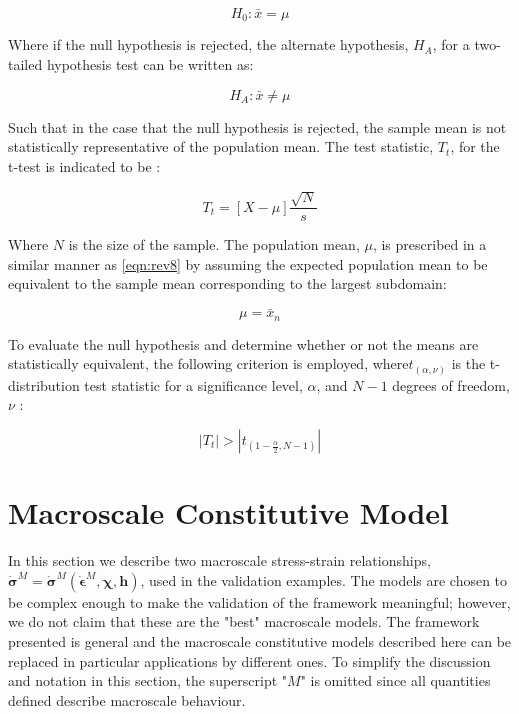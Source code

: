 \begin{equation}
H_0:\bar{x}=\mu
\label{eqn:rev11}
\end{equation}

Where if the null hypothesis is rejected, the alternate hypothesis, $H_A$, for a two-tailed hypothesis test can be written as:

\begin{equation}
H_A:\bar{x}\neq\mu
\label{eqn:rev12}
\end{equation}

Such that in the case that the null hypothesis is rejected, the sample mean is not statistically representative of the population mean. The test statistic, $T_t$, for the t-test is indicated to be \citep{walpole_probability_2007}:

\begin{equation}
T_t=\left[X-\mu\right]\frac{\sqrt{N}}{s}
\label{eqn:rev13}
\end{equation}

Where $N$ is the size of the sample. The population mean, $\mu$, is prescribed in a similar manner as \ref{eqn:rev8} by assuming the expected population mean to be equivalent to the sample mean corresponding to the largest subdomain:

\begin{equation}
\mu=\bar{x}_n
\label{eqn:rev14}
\end{equation}

To evaluate the null hypothesis and determine whether or not the means are statistically equivalent, the following criterion is employed, where$t_{\left(\alpha, \nu\right)}$ is the t-distribution test statistic for a significance level, $\alpha$, and $N-1$ degrees of freedom, $\nu$ \citep{walpole_probability_2007}:

\begin{equation}
\left|T_t\right|>\left|t_{\left(1-\frac{\alpha}{2}, N-1\right)}\right|
\label{eqn:rev15}
\end{equation}

\section{Macroscale Constitutive Model}

In this section we describe two macroscale stress-strain relationships, $\dot{\boldsymbol{\sigma}}^M=\dot{\boldsymbol{\sigma}}^M\left(\dot{\boldsymbol{\epsilon}}^M, \boldsymbol{\chi},\mathbf{h}\right)$, used in the validation examples. The models are chosen to be complex enough to make the validation of the framework meaningful; however, we do not claim that these are the "best" macroscale models. The framework presented is general and the macroscale constitutive models described here can be replaced in particular applications by different ones. To simplify the discussion and notation in this section, the superscript "$M$" is omitted since all quantities defined describe macroscale behaviour.

